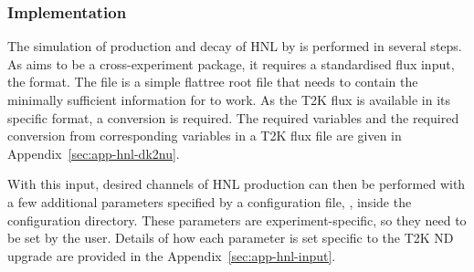     \subsubsection{Implementation}
        The simulation of production and decay of HNL by  is performed in several steps.
        As  aims to be a cross-experiment package, it requires a standardised flux input, the  format. 
        The  file is a simple flattree root file that needs to contain the minimally sufficient information for  to work.
        As the T2K flux is available in its specific format, a conversion is required. 
        The required  variables and the required conversion from corresponding variables in a T2K flux file are given in Appendix~\ref{sec:app-hnl-dk2nu}.

        With this input, desired channels of HNL production can then be performed with a few additional parameters specified by a configuration  file, , inside the  configuration directory. 
        These parameters are experiment-specific, so they need to be set by the user. Details of how each parameter is set specific to the T2K ND upgrade are provided in the Appendix~\ref{sec:app-hnl-input}. 

